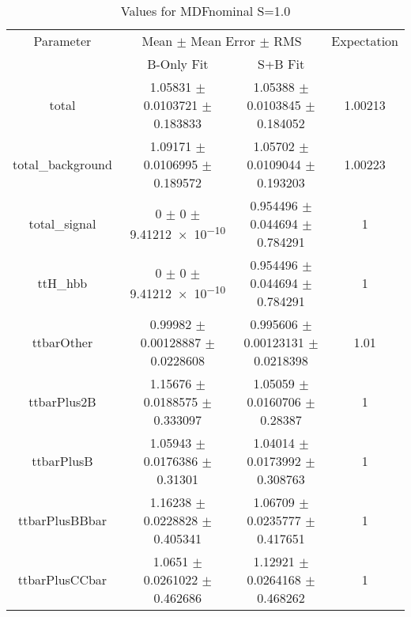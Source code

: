 \begin{table}
\centering
\caption{Values for MDFnominal S=1.0}
\begin{tabular}{cccc}
\toprule
Parameter & \multicolumn{2}{c}{Mean $\pm$ Mean Error $\pm$ RMS} & Expectation\\
 & B-Only Fit & S+B Fit & \\
\midrule
total & \num{1.05831} $\pm$ \num{0.0103721} $\pm$ \num{0.183833} & \num{1.05388} $\pm$ \num{0.0103845} $\pm$ \num{0.184052} & \num{1.00213}\\
total\_background & \num{1.09171} $\pm$ \num{0.0106995} $\pm$ \num{0.189572} & \num{1.05702} $\pm$ \num{0.0109044} $\pm$ \num{0.193203} & \num{1.00223}\\
total\_signal & \num{0} $\pm$ \num{0} $\pm$ \num{9.41212e-10} & \num{0.954496} $\pm$ \num{0.044694} $\pm$ \num{0.784291} & \num{1}\\
ttH\_hbb & \num{0} $\pm$ \num{0} $\pm$ \num{9.41212e-10} & \num{0.954496} $\pm$ \num{0.044694} $\pm$ \num{0.784291} & \num{1}\\
ttbarOther & \num{0.99982} $\pm$ \num{0.00128887} $\pm$ \num{0.0228608} & \num{0.995606} $\pm$ \num{0.00123131} $\pm$ \num{0.0218398} & \num{1.01}\\
ttbarPlus2B & \num{1.15676} $\pm$ \num{0.0188575} $\pm$ \num{0.333097} & \num{1.05059} $\pm$ \num{0.0160706} $\pm$ \num{0.28387} & \num{1}\\
ttbarPlusB & \num{1.05943} $\pm$ \num{0.0176386} $\pm$ \num{0.31301} & \num{1.04014} $\pm$ \num{0.0173992} $\pm$ \num{0.308763} & \num{1}\\
ttbarPlusBBbar & \num{1.16238} $\pm$ \num{0.0228828} $\pm$ \num{0.405341} & \num{1.06709} $\pm$ \num{0.0235777} $\pm$ \num{0.417651} & \num{1}\\
ttbarPlusCCbar & \num{1.0651} $\pm$ \num{0.0261022} $\pm$ \num{0.462686} & \num{1.12921} $\pm$ \num{0.0264168} $\pm$ \num{0.468262} & \num{1}\\
\bottomrule
\end{tabular}
\end{table}